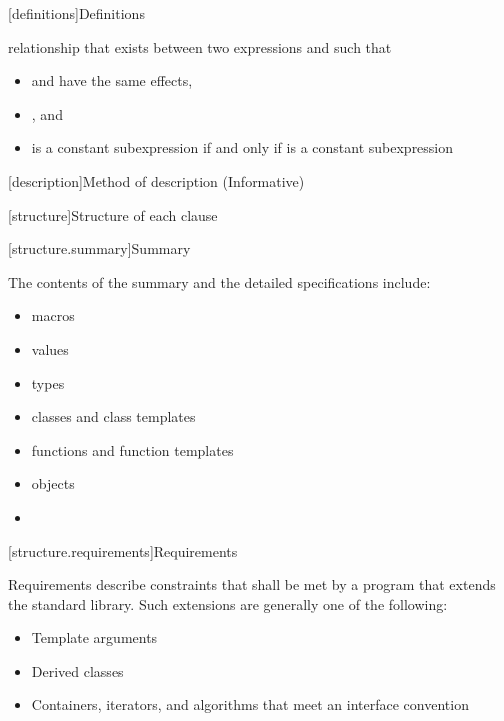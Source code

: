 \setcounter{section}{2}
[definitions]{Definitions}


\setcounter{subsection}{10}
%
relationship that exists between two expressions  and  such that
\begin{itemize}
\item
{} and  have the same effects,

\item
{}, and

\item
{} is a constant subexpression if and only if  is a constant subexpression
\end{itemize}

[description]{Method of description (Informative)}

[structure]{Structure of each clause}

\setcounter{subsubsection}{1}
[structure.summary]{Summary}


\setcounter{Paras}{1}
\pnum
The contents of the summary and the detailed specifications include:

\begin{itemize}
\item macros
\item values
\item types
\item classes and class templates
\item functions and function templates
\item objects
\item {}
\end{itemize}

[structure.requirements]{Requirements}


\pnum
{}%
Requirements describe constraints that shall be met by a \Cpp{} program that extends the standard library.
Such extensions are generally one of the following:

\begin{itemize}
\item Template arguments
\item Derived classes
\item Containers, iterators, and algorithms that meet an interface convention 
\end{itemize}

